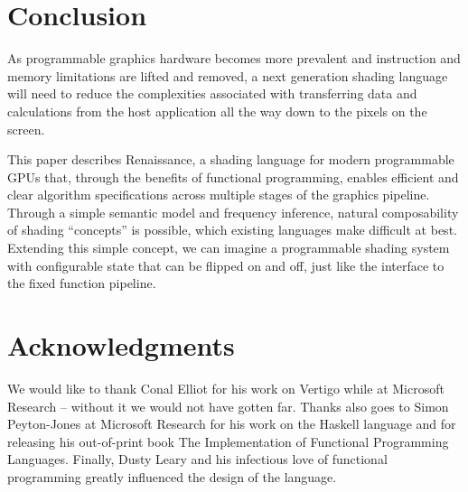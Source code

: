 \documentclass[review]{acmsiggraph}      %
\begin{document}
\section{Conclusion}

As programmable graphics hardware becomes more prevalent and
instruction and memory limitations are lifted and removed, a next
generation shading language will need to reduce the complexities
associated with transferring data and calculations from the host
application all the way down to the pixels on the screen.

This paper describes Renaissance, a shading language for modern
programmable GPUs that, through the benefits of functional
programming, enables efficient and clear algorithm specifications
across multiple stages of the graphics pipeline.  Through a simple
semantic model and frequency inference, natural composability of
shading ``concepts'' is possible, which existing languages make
difficult at best.  Extending this simple concept, we can imagine a
programmable shading system with configurable state that can be
flipped on and off, just like the interface to the fixed function
pipeline.

\section{Acknowledgments}

We would like to thank Conal Elliot for his work on Vertigo while at
Microsoft Research -- without it we would not have gotten far.  Thanks
also goes to Simon Peyton-Jones at Microsoft Research for his work on
the Haskell language and for releasing his out-of-print book The
Implementation of Functional Programming Languages.  Finally, Dusty
Leary and his infectious love of functional programming greatly
influenced the design of the language.



\end{document}
